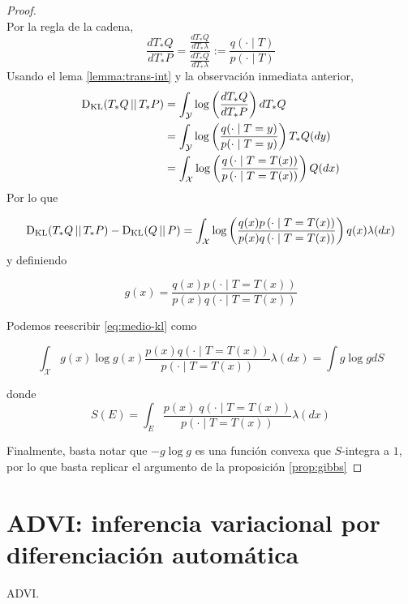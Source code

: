\documentclass[main.tex]{subfiles}
\begin{document}
\begin{proof} $\ $ \\
Por la regla de la cadena, 
\begin{equation*}
	\frac{dT_*Q}{dT_*P}=\frac{\frac{dT_*Q}{dT_*\lambda}}{\frac{dT_*Q}{dT_*\lambda}}
	:= \frac{q(\cdot\mid T)}{p(\cdot\mid T)}
\end{equation*}
Usando el lema \ref{lemma:trans-int} y la observación inmediata anterior,
\begin{align*}
\operatorname*{D_{KL}}(T_*Q\operatorname*{\mid\mid} T_*P) &= \int_\mathcal{Y}\log\left(\frac{dT_*Q}{dT_*P}\right)dT_*Q \\
&= \int_\mathcal{Y} \log\left(\frac{q(\cdot\mid T=y)}{p(\cdot\mid T=y)}\right)T_*Q(dy) \\
&= \int_\mathcal{X}\log\left(\frac{q\left(\cdot\mid T=T(x)\right)}{p\left(\cdot\mid T=T(x)\right)}\right)Q(dx) \\
\end{align*}
Por lo que 

\begin{equation}\label{eq:medio-kl}
\operatorname*{D_{KL}}(T_*Q\operatorname*{\mid\mid} T_*P)-\operatorname*{D_{KL}}(Q\operatorname*{\mid\mid} P)
	=\int_\mathcal{X} \log\left(
	\frac{q(x)p\left(\cdot\mid T= T(x)\right)}{p(x)q\left(\cdot\mid T=T(x)\right)}
	\right)
	q(x)\lambda(dx) \\
\end{equation}
y definiendo

\begin{equation*}
g(x)=\frac{q(x)p\left(\cdot\mid T=T(x)\right)}{p(x)q\left(\cdot\mid T=T(x)\right)}
\end{equation*}

Podemos reescribir \eqref{eq:medio-kl} como

\begin{equation*}
\int_\mathcal{X}g(x)\log g(x)\frac{p(x)q( \cdot \mid T=T(x))}{p( \cdot\mid T=T(x))}\lambda(dx)
= \int g \log g dS
\end{equation*}

donde 
\begin{equation*}
S(E) = \int_E \frac{p(x)\; q(\cdot \mid T=T(x))}{p\left(\cdot \mid T=T(x)\right)}\lambda(dx)
\end{equation*}

Finalmente, basta notar que $-g\log g$ es una función convexa que $S$-integra a $1$, por lo que basta replicar el argumento de la proposición \ref{prop:gibbs}
\end{proof}

\section{ADVI: inferencia variacional por diferenciación automática}
ADVI.
\end{document}
